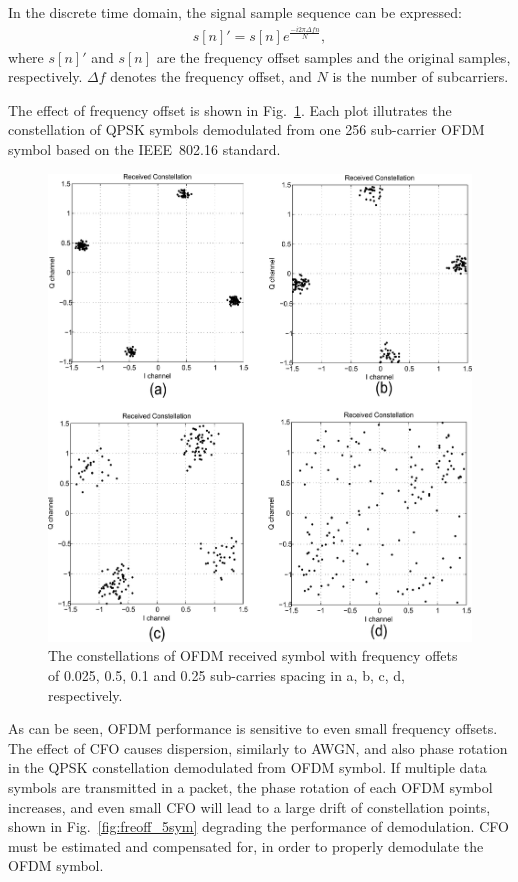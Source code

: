 In the discrete time domain, the signal sample sequence can be expressed: 
\begin{eqnarray}
\label{equ:}
            s[n]' = s[n] e^{\frac{− i2\pi \Delta fn}{N}},
\end{eqnarray}
where $s[n]'$ and $s[n]$ are the frequency offset samples and the original samples, respectively.
$\Delta f$ denotes the frequency offset, and $N$ is the number of subcarriers. 

The effect of frequency offset is shown in Fig.~\ref{fig:freoff_1sym}. Each plot illutrates the constellation of QPSK symbols demodulated from one 256 sub-carrier OFDM symbol based on the IEEE~802.16 standard.

\begin{figure}
	\centerline{\includegraphics [width=0.8\columnwidth] {Figures/freoff_1sym.pdf} }
	\caption{The constellations of OFDM received symbol with frequency offets of 0.025, 0.5, 0.1 and 0.25 sub-carries spacing in a, b, c, d, respectively.}
	\label{fig:freoff_1sym}
\end{figure}

As can be seen, OFDM performance is sensitive to even small frequency offsets. 
The effect of CFO causes dispersion, similarly to AWGN, and also phase rotation in the QPSK constellation demodulated from OFDM symbol.
If multiple data symbols are transmitted in a packet, the phase rotation of each OFDM symbol increases, and even small CFO will lead to a large drift of constellation points, shown in Fig.~\ref{fig:freoff_5sym} degrading the performance of demodulation. CFO must be estimated and compensated for, in order to properly demodulate the OFDM symbol.

